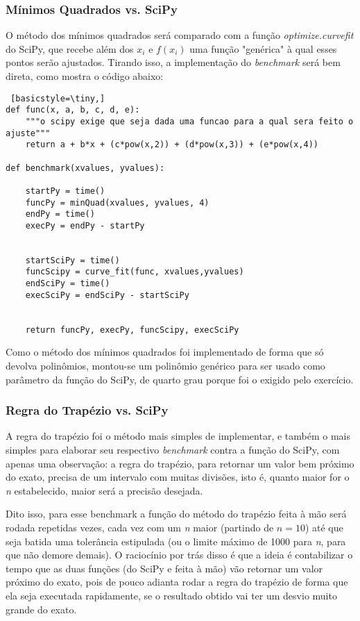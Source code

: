 \documentclass[12pt,A4]{report}
\begin{document}
\subsubsection{Mínimos Quadrados vs. SciPy}
O método dos mínimos quadrados será comparado com a função \textit{optimize.curvefit} do SciPy, que recebe além dos $x_i$ e $f(x_i)$ uma função "genérica" à qual esses pontos serão ajustados. Tirando isso, a implementação do \textit{benchmark} será bem direta, como mostra o código abaixo:

\begin{lstlisting} [basicstyle=\tiny,]
def func(x, a, b, c, d, e):    
    """o scipy exige que seja dada uma funcao para a qual sera feito o ajuste"""    
    return a + b*x + (c*pow(x,2)) + (d*pow(x,3)) + (e*pow(x,4))

def benchmark(xvalues, yvalues):

    startPy = time()
    funcPy = minQuad(xvalues, yvalues, 4)
    endPy = time()
    execPy = endPy - startPy
    
    
    startSciPy = time()
    funcScipy = curve_fit(func, xvalues,yvalues)
    endSciPy = time()
    execSciPy = endSciPy - startSciPy
    
    
    return funcPy, execPy, funcScipy, execSciPy

\end{lstlisting}
Como o método dos mínimos quadrados foi implementado de forma que só devolva polinômios, montou-se um polinômio genérico para ser usado como parâmetro da função do SciPy, de quarto grau porque foi o exigido pelo exercício.

\subsubsection{Regra do Trapézio vs. SciPy}
A regra do trapézio foi o método mais simples de implementar, e também o mais simples para elaborar seu respectivo \textit{benchmark} contra a função  do SciPy, com apenas uma observação: a regra do trapézio, para retornar um valor bem próximo do exato, precisa de um intervalo com muitas divisões, isto é, quanto maior for o \textit{n} estabelecido, maior será a precisão desejada.

Dito isso, para esse \textit{}{benchmark} a função do método do trapézio feita à mão será rodada repetidas vezes, cada vez com um \textit{n} maior (partindo de $\textit{n} = 10$) até que seja batida uma tolerância estipulada (ou o limite máximo de 1000 para \textit{n}, para que não demore demais). O raciocínio por trás disso é que a ideia é contabilizar o tempo que as duas funções (do SciPy e feita à mão) vão retornar um valor próximo do exato, pois de pouco adianta rodar a regra do trapézio de forma que ela seja executada rapidamente, se o resultado obtido vai ter um desvio muito grande do exato.
\end{document}
